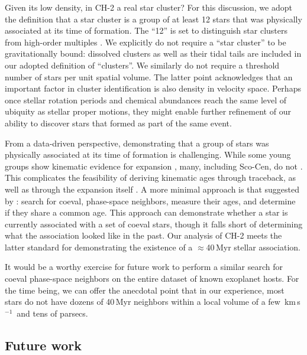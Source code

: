 \documentclass[12pt,twocolumn]{aastex63}
\newcommand{\kms}{\,km\,s$^{-1}$}
\begin{document}
Given its low density, in CH-2 a real star cluster?  For this
discussion, we adopt the definition that a star cluster is a group of
at least 12 stars that was physically associated at its time of
formation.  The ``12'' is set to distinguish star clusters from
high-order multiples \citep[see][]{krumholz_star_2019}.  We explicitly
do not require a ``star cluster'' to be gravitationally bound:
dissolved clusters as well as their tidal tails are included in our
adopted definition of ``clusters''.  We similarly do not require a
threshold number of stars per unit spatial volume.  The latter point
acknowledges that an important factor in cluster identification is
also density in velocity space.  Perhaps once stellar rotation periods
and chemical abundances reach the same level of ubiquity as stellar
proper motions, they might enable further refinement of our ability to
discover stars that formed as part of the same event.

From a data-driven perspective, demonstrating that a group of stars
was physically associated at its time of formation is challenging.
While some young groups show kinematic evidence for expansion
\citep{kuhn_kinematics_2019}, many, including Sco-Cen, do not
\citep{wright_kinematics_2018}.  This complicates the feasibility of
deriving kinematic ages through traceback, as well as through the
expansion itself \citep[see][]{crundall_chronostar_2019}.  A more
minimal approach is that suggested by \citet{tofflemire_2021}: search
for coeval, phase-space neighbors, measure their ages, and determine
if they share a common age.  This approach can demonstrate whether a
star is currently associated with a set of coeval stars, though it
falls short of determining what the association looked like in the
past.  Our analysis of CH-2 meets the latter standard for
demonstrating the
existence of a $\approx$40\,Myr stellar association. 

It would be a worthy exercise for future work to perform a similar
search for coeval phase-space neighbors on the entire dataset of known
exoplanet hosts.  For the time being, we can offer the anecdotal point
that in our experience, most stars do not have dozens of 40\,Myr
neighbors within a local volume of a few \!\kms\ and tens of parsecs.


\subsection{Future work}
\end{document}
